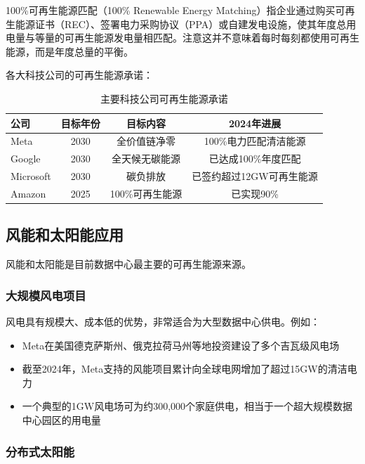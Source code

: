 \begin{definition}[100\%可再生能源匹配]
100\%可再生能源匹配（100\% Renewable Energy Matching）指企业通过购买可再生能源证书（REC）、签署电力采购协议（PPA）或自建发电设施，使其年度总用电量与等量的可再生能源发电量相匹配。注意这并不意味着每时每刻都使用可再生能源，而是年度总量的平衡。
\end{definition}

各大科技公司的可再生能源承诺：

\begin{table}[htbp]
\centering
\caption{主要科技公司可再生能源承诺}
\begin{tabular}{lccc}
\toprule
\textbf{公司} & \textbf{目标年份} & \textbf{目标内容} & \textbf{2024年进展} \\
\midrule
Meta & 2030 & 全价值链净零 & 100\%电力匹配清洁能源 \\
Google & 2030 & 全天候无碳能源 & 已达成100\%年度匹配 \\
Microsoft & 2030 & 碳负排放 & 已签约超过12GW可再生能源 \\
Amazon & 2025 & 100\%可再生能源 & 已实现90\% \\
\bottomrule
\end{tabular}
\label{tab:renewable-commitments}
\end{table}

\subsection{风能和太阳能应用}

风能和太阳能是目前数据中心最主要的可再生能源来源。

\subsubsection{大规模风电项目}

风电具有规模大、成本低的优势，非常适合为大型数据中心供电。例如：
\begin{itemize}
    \item Meta在美国德克萨斯州、俄克拉荷马州等地投资建设了多个吉瓦级风电场
    \item 截至2024年，Meta支持的风能项目累计向全球电网增加了超过15GW的清洁电力
    \item 一个典型的1GW风电场可为约300,000个家庭供电，相当于一个超大规模数据中心园区的用电量
\end{itemize}

\subsubsection{分布式太阳能}

